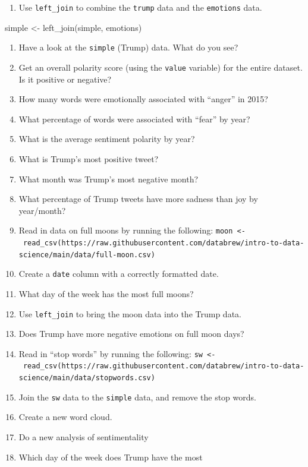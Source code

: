 \documentclass[
]{book}
\newenvironment{Shaded}{\begin{snugshade}}{\end{snugshade}}
\newcommand{\FunctionTok}[1]{\textcolor[rgb]{0.00,0.00,0.00}{#1}}
\newcommand{\NormalTok}[1]{#1}
\newcommand{\OtherTok}[1]{\textcolor[rgb]{0.56,0.35,0.01}{#1}}
\providecommand{\tightlist}{%
  \setlength{\itemsep}{0pt}\setlength{\parskip}{0pt}}
\begin{document}
\begin{enumerate}
\def\labelenumi{\arabic{enumi}.}
\setcounter{enumi}{20}
\tightlist
\item
  Use \texttt{left\_join} to combine the \texttt{trump} data and the \texttt{emotions} data.
\end{enumerate}

\begin{Shaded}
\begin{Highlighting}[]
\NormalTok{simple }\OtherTok{\textless{}{-}} \FunctionTok{left\_join}\NormalTok{(simple, emotions)}
\end{Highlighting}
\end{Shaded}

\begin{enumerate}
\def\labelenumi{\arabic{enumi}.}
\setcounter{enumi}{21}
\item
  Have a look at the \texttt{simple} (Trump) data. What do you see?
\item
  Get an overall polarity score (using the \texttt{value} variable) for the entire dataset. Is it positive or negative?
\item
  How many words were emotionally associated with ``anger'' in 2015?
\item
  What percentage of words were associated with ``fear'' by year?
\item
  What is the average sentiment polarity by year?
\item
  What is Trump's most positive tweet?
\item
  What month was Trump's most negative month?
\item
  What percentage of Trump tweets have more sadness than joy by year/month?
\item
  Read in data on full moons by running the following: \texttt{moon\ \textless{}-\ read\_csv(\textquotesingle{}https://raw.githubusercontent.com/databrew/intro-to-data-science/main/data/full-moon.csv\textquotesingle{})}
\item
  Create a \texttt{date} column with a correctly formatted date.
\item
  What day of the week has the most full moons?
\item
  Use \texttt{left\_join} to bring the moon data into the Trump data.
\item
  Does Trump have more negative emotions on full moon days?
\item
  Read in ``stop words'' by running the following: \texttt{sw\ \textless{}-\ read\_csv(\textquotesingle{}https://raw.githubusercontent.com/databrew/intro-to-data-science/main/data/stopwords.csv\textquotesingle{})}
\item
  Join the \texttt{sw} data to the \texttt{simple} data, and remove the stop words.
\item
  Create a new word cloud.
\item
  Do a new analysis of sentimentality
\item
  Which day of the week does Trump have the most
\end{enumerate}
\end{document}

